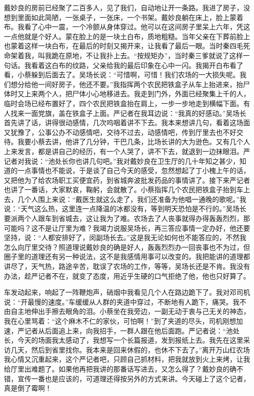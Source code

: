 \documentclass[12pt,oneside]{book}
\begin{document}
戴妙良的房前已经聚了二百多人，见了我们，自动地让开一条路。我进了房子，没想到里面如此简陋，一张桌子，一张床，一个书架。戴妙良躺在床上，脸上蒙着布。我看了心中一震，一个冷颤从身体穿过。他可以在这间房子里呆上六年，凭这一点他就是个好人。蒙在脸上的是一块土白布，质地粗糙。当年父亲在下葬前脸上也蒙着这样一块白布，在最后的时刻又揭开来，让我看了最后一眼。当时秦四毛死命架着我，叫我跪在原地，不让我扑上去。``按规矩办''，当时秦三爹就说了这样一句话。我看着这白布的纹路，父亲给我的最后印象在心中一闪。我揭开白布看了看，小蔡躲到后面去了。吴场长说：``可惜啊，可惜！我们农场的一大损失呢。我们想分给他一间好房子，他还不要。''我指挥两个农民把铁盒子从车上抬进来，抬尸体时又上来两个人，把尸体小心地移进去。我走到门外，外面已经聚集上千的人，临时会场已经布置好了，四个农民把铁盒抬在肩上，一步一步地走到横幅下面。有人找来一面党旗，盖在铁盒子上面。严记者在我耳边说：``我真的好感动。''吴场长首先讲了话，讲得很动感情，几次呜咽着讲不下去。我本来想讲几句，看着这场面又犹豫了，公事公办不动感情吧，交待不过去，动感情吧，传到厅里去也不好交待。我要小蔡去讲，他讲了几分钟，干巴几条，比场长讲的大为逊色。又有几个人上来发言，都是讲自己的经历，有一个人哭了，讲不下去，就退到一边抹眼泪。严记者对我说：``池处长你也讲几句吧。''我对戴妙良在卫生厅的几十年知之甚少，知道的一点事情也不能说，于是谈了自己今天的感受，忽然想起了丁小槐上午的话，又把他为了给农场职工买便宜药，到省城奔波批发药品的事情讲了。接下来严记者也讲了一番话，大家默哀，鞠躬，会就散了。小蔡指挥几个农民把铁盒子抬到车上去，几个人围上来说：``戴医生就这么走了，我们还准备为他唱一通晚的歌呢。''我说：``天气这么热，这里连一点降温的冰都没有，等到明天恐怕是不行的。''吴场长要派两个人跟车到省城去，这让我为了难。农场去了人丧事就得办得轰轰烈烈，那可能吗？这不是让厅里为难？我竭力说服吴场长，再三答应事情一定办好，他还要坚持，说：``人都安排好了，闵副场长去。''这是我无论如何也不能答应的，不然我怎么向厅里交待？照道理说戴妙良的确是好人，轰轰烈烈办一回丧事也不为过，但圈子里的道理还有另一种说法，这不是我感情用事可以改变的。我把能讲的道理都讲尽了，天气热，路途辛苦，耽误了农场的工作，等等，吴场长还是不肯。我没有办法，趁严记者不在，就变了态度，用近乎生硬的口气拒绝了他，他也只好算了。

车发动起来，响起了一阵鞭炮声，硝烟中我看见几个人在路边跪下了。我对邓司机说：``开最慢的速度。''车缓缓从人群的夹道中穿过，不断地有人跪下，痛哭。我不由自主地伸出手擦去眼角的泪。小蔡坐在我旁边，一副无动于衷与己无关的神态，我在心里骂着：``这个麻木不仁的家伙，可怕啊！''到了夹道的尽头，司机刚想加速，严记者从后面追上来，向我招手，一群人跟在他后面跑。严记者说：``池处长，今天的场面我太感动了，我想写一个长篇报道，发到报纸上去。我先在这里采访几天，然后到省里找你。我本来是回来休假的，也休不下去了。''离开万山红农场我心情又沉重起来，这个严记者吧，只顾自己抓材料，把我就放到火上来烤，让我给厅里出难题了。如果他再把我讲的那番话写进去，又怎么得了？戴妙良的确不错，宣传一番也是应该的，可道理还得按另外的方式来讲。今天碰上了这个记者，真是倒了霉啊！
\end{document}
